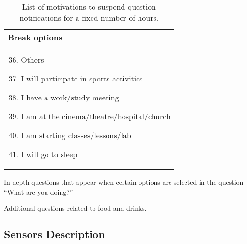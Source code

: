 \begin{table}[]
    \centering
    \caption{List of motivations to suspend question notifications for a fixed number of hours.}
    \label{tab:break}
    \begin{tabularx}{0.50\textwidth}{X}
        \toprule
        \textbf{Break options}\\
        \midrule
        \begin{enumerate}
        \setcounter{enumi}{35}
        \item Others
        \item I will participate in sports activities
        \item I have a work/study meeting
        \item I am at the cinema/theatre/hospital/church
        \item I am starting classes/lessons/lab
        \item I will go to sleep
        \end{enumerate} 
        \\
    \bottomrule
    \end{tabularx}
\end{table}

\begin{table}
    \footnotesize
    \centering
    \caption{In-depth questions that appear when certain options are selected in the question ``What are you doing?''}
    \label{tab:td_sub}
    
\end{table}

\begin{table}
    \footnotesize
    \centering
    \caption{Additional questions related to food and drinks.}
    \label{tab:tb_snack}
    
\end{table}

\newpage 

\subsection{Sensors Description}\label{app2:sensors}


